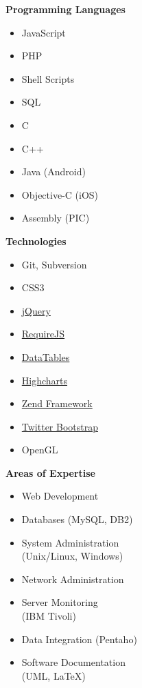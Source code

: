 \noindent
\begin{minipage}[t]{.3\linewidth}
\vspace{0pt}
\textbf{Programming Languages}
\begin{itemize}[itemsep=0pt]    %
    \item JavaScript
    \item PHP
    \item Shell Scripts
    \item SQL
    \item C
    \item C++
    \item Java (Android)
    \item Objective-C (iOS)
    \item Assembly (PIC)
\end{itemize}
\end{minipage}
%
\hfill
%
\begin{minipage}[t]{.25\linewidth}
\vspace{0pt}
\textbf{Technologies}
\begin{itemize}[itemsep=0pt]
    \item Git, Subversion
    \item CSS3
    \item \href{http://jquery.com}{jQuery}
    \item \href{http://requirejs.org}{RequireJS}
    \item \href{http://datatables.net}{DataTables}
    \item \href{http://www.highcharts.com}{Highcharts}
    \item \href{http://framework.zend.com}{Zend Framework}
    \item \href{http://getbootstrap.com}{Twitter Bootstrap}
    \item OpenGL
\end{itemize}
\end{minipage}
%
\hfill
%
\begin{minipage}[t]{.35\linewidth}
\vspace{0pt}
\textbf{Areas of Expertise}
\begin{itemize}[itemsep=0pt]
    \item Web Development
    \item Databases (MySQL, DB2)
    \item System Administration \\ (Unix/Linux, Windows)
    \item Network Administration
    \item Server Monitoring \\ (IBM Tivoli)
    \item Data Integration (Pentaho)
    \item Software Documentation \\ (UML, LaTeX)
\end{itemize}
\end{minipage}